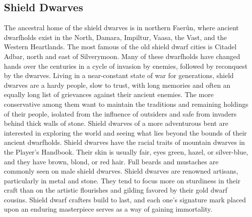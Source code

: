 \documentclass[10pt,a4paper,twoside,twocolumn,openany,bg=print,nodeprecatedcode]{dndbook}
\begin{document}
\subsection{Shield Dwarves}
The ancestral home of the shield dwarves is in northern Faerûn, where ancient dwarfholds exist in the North, Damara, Impiltur, Vaasa, the Vast, and the Western Heartlands. The most famous of the old shield dwarf cities is Citadel Adbar, north and east of Silverymoon. Many of these dwarfholds have changed hands over the centuries in a cycle of invasion by enemies, followed by reconquest by the dwarves.
Living in a near-constant state of war for generations, shield dwarves are a hardy people, slow to trust, with long memories and often an equally long list of grievances against their ancient enemies. The more conservative among them want to maintain the traditions and remaining holdings of their people, isolated from the influence of outsiders and safe from invaders behind thick walls of stone. Shield dwarves of a more adventurous bent are interested in exploring the world and seeing what lies beyond the bounds of their ancient dwarfholds.
Shield dwarves have the racial traits of mountain dwarves in the Player's Handbook. Their skin is usually fair, eyes green, hazel, or silver-blue, and they have brown, blond, or red hair. Full beards and mustaches are commonly seen on male shield dwarves.
Shield dwarves are renowned artisans, particularly in metal and stone. They tend to focus more on sturdiness in their craft than on the artistic flourishes and gilding favored by their gold dwarf cousins. Shield dwarf crafters build to last, and each one's signature mark placed upon an enduring masterpiece serves as a way of gaining immortality.
\end{document}
